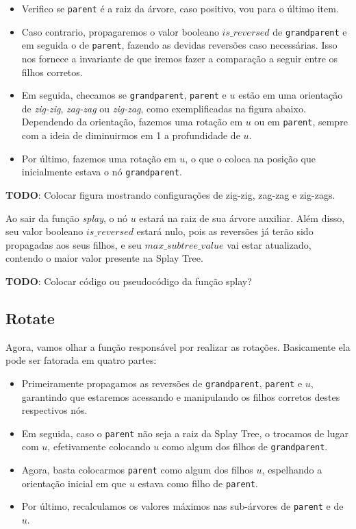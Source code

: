\begin{itemize}
    \item Verifico se \texttt{parent} é a raiz da árvore, caso positivo, vou para o último item.
    \item Caso contrario, propagaremos o valor booleano $is\_reversed$ de \texttt{grandparent} e em seguida o de \texttt{parent}, fazendo as devidas reversões caso necessárias. Isso nos fornece a invariante de que iremos fazer a comparação a seguir entre os filhos corretos.
    \item Em seguida, checamos se \texttt{grandparent}, \texttt{parent} e $u$ estão em uma orientação de \textit{zig-zig}, \textit{zag-zag} ou \textit{zig-zag}, como exemplificadas na figura abaixo. Dependendo da orientação, fazemos uma rotação em $u$ ou em \texttt{parent}, sempre com a ideia de diminuirmos em 1 a profundidade de $u$.
    \item Por último, fazemos uma rotação em $u$, o que o coloca na posição que inicialmente estava o nó \texttt{grandparent}.
\end{itemize}

\begin{center}
    \textbf{TODO}: Colocar figura mostrando configurações de zig-zig, zag-zag e zig-zags.
\end{center}

Ao sair da função \emph{splay}, o nó $u$ estará na raiz de sua árvore auxiliar. Além disso, seu valor booleano $is\_reversed$ estará nulo, pois as reversões já terão sido propagadas aos seus filhos, e seu $max\_subtree\_value$ vai estar atualizado, contendo o maior valor presente na Splay Tree.

\begin{center}
    \textbf{TODO}: Colocar código ou pseudocódigo da função splay?
\end{center}

\subsection{Rotate}
\label{subsection:lct-splay-rotate}

Agora, vamos olhar a função responsável por realizar as rotações. Basicamente ela pode ser fatorada em quatro partes:

\begin{itemize}
    \item Primeiramente propagamos as reversões de \texttt{grandparent}, \texttt{parent} e $u$, garantindo que estaremos acessando e manipulando os filhos corretos destes respectivos nós.
    \item Em seguida, caso o \texttt{parent} não seja a raiz da Splay Tree, o trocamos  de lugar com $u$, efetivamente colocando $u$ como algum dos filhos de \texttt{grandparent}.
    \item Agora, basta colocarmos \texttt{parent} como algum dos filhos $u$, espelhando a orientação inicial em que $u$ estava como filho de \texttt{parent}.
    \item Por último, recalculamos os valores máximos nas sub-árvores de \texttt{parent} e de $u$.
\end{itemize}

